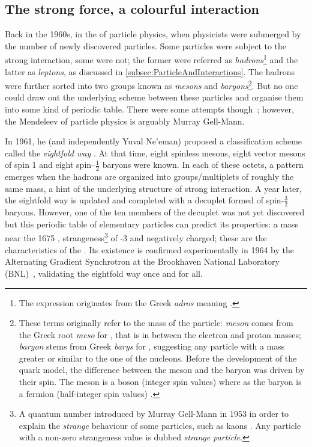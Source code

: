 

\subsection{The strong force, a colourful interaction}
\label{subsec:strongforce}

Back in the 1960s, in the  of particle physics, when physicists were submerged by the number of newly discovered  particles. Some particles were subject to the strong interaction, some were not; the former were referred as \textit{hadrons}\footnote{The expression originates from the Greek \textit{adros} meaning .} and the latter as \textit{leptons}, as discussed in \Sec\ref{subsec:ParticleAndInteractions}. The hadrons were further sorted into two groups known as \textit{mesons} and \textit{baryons}\footnote{These terms originally refer to the mass of the particle: \textit{meson} comes from the Greek root \textit{meso} for , that is in between the electron and proton masses; \textit{baryon} stems from Greek \textit{barys} for , suggesting any particle with a mass greater or similar to the one of the nucleons. Before the development of the quark model, the difference between the meson and the baryon was driven by their spin. The meson is a boson (integer spin values) where as the baryon is a fermion (half-integer spin values) \cite{s.glashowInteractionsJourneyMind1990}.}. But no one could draw out the underlying scheme between these particles and organise them into some kind of periodic table. There were some attempts though~\cite{sakataCompositeModelNew1956, sakuraiTheoryStrongInteractions1960}; however, the Mendeleev of particle physics is arguably Murray Gell-Mann.

In 1961, he (and independently Yuval Ne'eman) proposed a classification scheme called the \textit{eightfold way} \cite{gell-mannEIGHTFOLDWAYTHEORY1961, neemanDerivationStrongInteractions1961}. At that time, eight spinless mesons, eight vector mesons of spin 1 and eight spin--$\frac{1}{2}$ baryons were known. In each of these octets, a pattern emerges when the hadrons are organized into groups/multiplets of roughly the same mass, a hint of the underlying structure of strong interaction. A year later, the eightfold way is updated and completed with a decuplet formed of spin-$\frac{3}{2}$ baryons. However, one of the ten members of the decuplet was not yet discovered but this periodic table of elementary particles can predict its properties: a mass near the 1675 \mmass, strangeness\footnote{A quantum number introduced by Murray Gell-Mann in 1953 in order to explain the \textit{strange} behaviour of some particles, such as kaons \cite{gell-mannIsotopicSpinNew1953}. Any particle with a non-zero strangeness value is dubbed \textit{strange particle}.} of -3 and negatively charged; these are the characteristics of the \rmOmegaM. Its existence is confirmed experimentally in 1964 by the Alternating Gradient Synchrotron at the Brookhaven National Laboratory (BNL)~\cite{barnesObservationHyperonStrangeness1964a}, validating the eightfold way once and for all.\\

